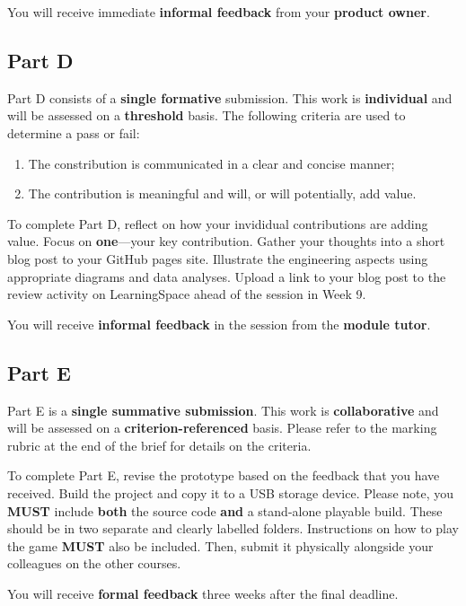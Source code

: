 \documentclass{../../fal_assignment}
\begin{document}
You will receive immediate \textbf{informal feedback} from your \textbf{product owner}.

\subsection*{Part D}

Part D consists of a \textbf{single formative} submission. This work is \textbf{individual} and will be assessed on a \textbf{threshold} basis.  The following criteria are used to determine a pass or fail:

\begin{enumerate}[label=(\alph*)]
	\item The constribution is communicated in a clear and concise manner;
	\item The contribution is meaningful and will, or will potentially, add value.
\end{enumerate}

To complete Part D, reflect on how your invididual contributions are adding value. Focus on \textbf{one}---your key contribution. Gather your thoughts into a short blog post to your GitHub pages site. Illustrate the engineering aspects using appropriate diagrams and data analyses. Upload a link to your blog post to the review activity on LearningSpace ahead of the session in Week 9. 

You will receive \textbf{informal feedback} in the session from the \textbf{module tutor}.

\subsection*{Part E}

Part E is a \textbf{single summative submission}. This work is \textbf{collaborative} and will be assessed on a \textbf{criterion-referenced} basis. Please refer to the marking rubric at the end of the brief for details on the criteria.

To complete Part E, revise the prototype based on the feedback that you have received. Build the project and copy it to a USB storage device. Please note, you \textbf{MUST} include \textbf{both} the source code \textbf{and} a stand-alone playable build. These should be in two separate and clearly labelled folders. Instructions on how to play the game \textbf{MUST} also be included. Then, submit it physically alongside your colleagues on the other courses.

You will receive \textbf{formal feedback} three weeks after the final deadline.
\end{document}
